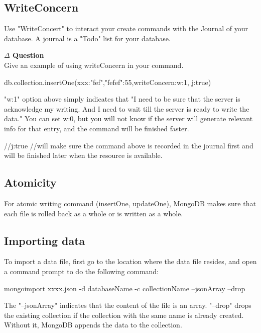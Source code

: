 \documentclass[12pt]{article}
\newenvironment{que}
    { \begin{mdframed}[backgroundcolor=green!20] \textbf{$\Delta$ Question} \\}
    {  \end{mdframed}}
\begin{document}
\subsection{WriteConcern}
Use "WriteConcert" to interact your create commands with the Journal of your database. A journal is a "Todo" list for your database.
\begin{que}
Give an example of using writeConcern in your command.
\end{que}
\begin{code}
db.collection.insertOne({xxx:"fef","fefef":55},{writeConcern:{w:1, j:true}})
\end{code}
"w:1" option above simply indicates that "I need to be sure that the server is acknowledge my writing. And I need to wait till the server is ready to write the data." You can set {w:0}, but you will not know if the server will generate relevant info for that entry, and the command will be finished faster.
\begin{code}
//j:true
//will make sure the command above is recorded in the journal first and will be finished later when the resource is available.
\end{code}
\subsection{Atomicity}
For atomic writing command (insertOne, updateOne), MongoDB makes sure that each file is rolled back as a whole or is written as a whole.
\subsection{Importing data}
To import a data file, first go to the location where the data file resides, and open a command prompt to do the following command:
\begin{code}
mongoimport xxxx.json -d databaseName -c collectionName --jsonArray --drop
\end{code}
The "--jsonArray" indicates that the content of the file is an array. "--drop" drops the existing collection if the collection with the same name is already created. Without it, MongoDB appends the data to the collection.
\newpage
\end{document}
